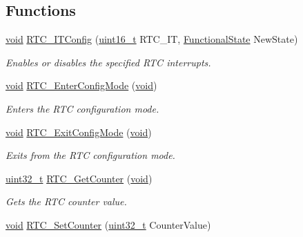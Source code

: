 \subsection*{Functions}
\begin{DoxyCompactItemize}
\item 
\hyperlink{usb__devapi_8h_afabf60e7f57651d6d595a02c75f07cd0}{void} \hyperlink{group___r_t_c___private___functions_ga175dfe88866234730c1ec40d2221c4f4}{R\+T\+C\+\_\+\+I\+T\+Config} (\hyperlink{_p_e___types_8h_a1f1825b69244eb3ad2c7165ddc99c956}{uint16\+\_\+t} R\+T\+C\+\_\+\+IT, \hyperlink{agilefox_2library_2inc_2stm32f10x__type_8h_ac9a7e9a35d2513ec15c3b537aaa4fba1}{Functional\+State} New\+State)
\begin{DoxyCompactList}\small\item\em Enables or disables the specified R\+TC interrupts. \end{DoxyCompactList}\item 
\hyperlink{usb__devapi_8h_afabf60e7f57651d6d595a02c75f07cd0}{void} \hyperlink{group___r_t_c___private___functions_ga23612d9da2fe057a0cd72c684e5b438a}{R\+T\+C\+\_\+\+Enter\+Config\+Mode} (\hyperlink{usb__devapi_8h_afabf60e7f57651d6d595a02c75f07cd0}{void})
\begin{DoxyCompactList}\small\item\em Enters the R\+TC configuration mode. \end{DoxyCompactList}\item 
\hyperlink{usb__devapi_8h_afabf60e7f57651d6d595a02c75f07cd0}{void} \hyperlink{group___r_t_c___private___functions_ga7585aa6e2dbb497173b2fd03bac0d304}{R\+T\+C\+\_\+\+Exit\+Config\+Mode} (\hyperlink{usb__devapi_8h_afabf60e7f57651d6d595a02c75f07cd0}{void})
\begin{DoxyCompactList}\small\item\em Exits from the R\+TC configuration mode. \end{DoxyCompactList}\item 
\hyperlink{_p_e___types_8h_a33594304e786b158f3fb30289278f5af}{uint32\+\_\+t} \hyperlink{group___r_t_c___private___functions_ga6edb19a0ad8414a40610341121c5ea6c}{R\+T\+C\+\_\+\+Get\+Counter} (\hyperlink{usb__devapi_8h_afabf60e7f57651d6d595a02c75f07cd0}{void})
\begin{DoxyCompactList}\small\item\em Gets the R\+TC counter value. \end{DoxyCompactList}\item 
\hyperlink{usb__devapi_8h_afabf60e7f57651d6d595a02c75f07cd0}{void} \hyperlink{group___r_t_c___private___functions_gafa81ec17158de1d1a7740eca81b9fb65}{R\+T\+C\+\_\+\+Set\+Counter} (\hyperlink{_p_e___types_8h_a33594304e786b158f3fb30289278f5af}{uint32\+\_\+t} Counter\+Value)

\end{DoxyCompactItemize}

